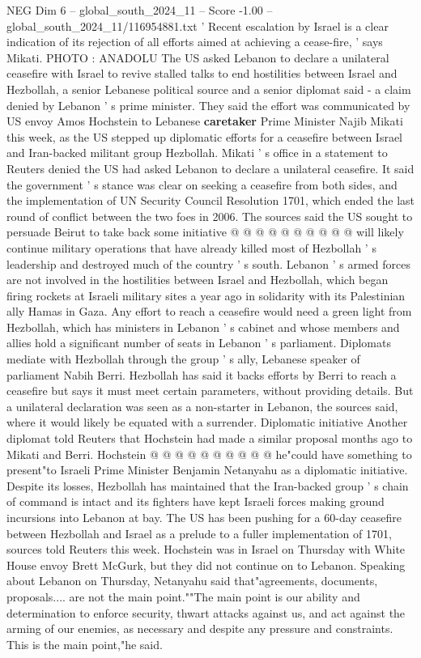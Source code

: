 \begin{textsample}{NEG Dim 6 – global\_south\_2024\_11 – Score -1.00 – global\_south\_2024\_11/116954881.txt}  \label{ex:f6_neg_066}
' Recent escalation by Israel is a clear indication of its rejection of all efforts aimed at achieving a cease-fire, ' says Mikati.
PHOTO : ANADOLU The US asked Lebanon to declare a unilateral ceasefire with Israel to revive stalled talks to end hostilities between Israel and Hezbollah, a senior Lebanese political source and a senior diplomat said - a claim denied by Lebanon ' s prime minister.
They said the effort was communicated by US envoy Amos Hochstein to Lebanese \textbf{caretaker} Prime Minister Najib Mikati this week, as the US stepped up diplomatic efforts for a ceasefire between Israel and Iran-backed militant group Hezbollah.
Mikati ' s office in a statement to Reuters denied the US had asked Lebanon to declare a unilateral ceasefire.
It said the government ' s stance was clear on seeking a ceasefire from both sides, and the implementation of UN Security Council Resolution 1701, which ended the last round of conflict between the two foes in 2006.
The sources said the US sought to persuade Beirut to take back some initiative @ @ @ @ @ @ @ @ @ @ will likely continue military operations that have already killed most of Hezbollah ' s leadership and destroyed much of the country ' s south.
Lebanon ' s armed forces are not involved in the hostilities between Israel and Hezbollah, which began firing rockets at Israeli military sites a year ago in solidarity with its Palestinian ally Hamas in Gaza.
Any effort to reach a ceasefire would need a green light from Hezbollah, which has ministers in Lebanon ' s cabinet and whose members and allies hold a significant number of seats in Lebanon ' s parliament.
Diplomats mediate with Hezbollah through the group ' s ally, Lebanese speaker of parliament Nabih Berri.
Hezbollah has said it backs efforts by Berri to reach a ceasefire but says it must meet certain parameters, without providing details.
But a unilateral declaration was seen as a non-starter in Lebanon, the sources said, where it would likely be equated with a surrender.
Diplomatic initiative Another diplomat told Reuters that Hochstein had made a similar proposal months ago to Mikati and Berri.
Hochstein @ @ @ @ @ @ @ @ @ @ he"could have something to present"to Israeli Prime Minister Benjamin Netanyahu as a diplomatic initiative.
Despite its losses, Hezbollah has maintained that the Iran-backed group ' s chain of command is intact and its fighters have kept Israeli forces making ground incursions into Lebanon at bay.
The US has been pushing for a 60-day ceasefire between Hezbollah and Israel as a prelude to a fuller implementation of 1701, sources told Reuters this week.
Hochstein was in Israel on Thursday with White House envoy Brett McGurk, but they did not continue on to Lebanon.
Speaking about Lebanon on Thursday, Netanyahu said that"agreements, documents, proposals.... are not the main point.""The main point is our ability and determination to enforce security, thwart attacks against us, and act against the arming of our enemies, as necessary and despite any pressure and constraints.
This is the main point,"he said.

\end{textsample}
